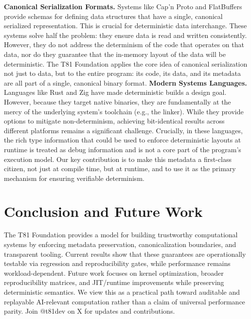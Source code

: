\documentclass[sigconf, 10pt]{acmart}
\begin{document}
\textbf{Canonical Serialization Formats.} Systems like Cap'n Proto \cite{capnproto} and FlatBuffers \cite{flatbuffers} provide schemas for defining data structures that have a single, canonical serialized representation. This is crucial for deterministic data interchange. These systems solve half the problem: they ensure data is read and written consistently. However, they do not address the determinism of the code that operates on that data, nor do they guarantee that the in-memory layout of the data will be deterministic. The T81 Foundation applies the core idea of canonical serialization not just to data, but to the entire program: its code, its data, and its metadata are all part of a single, canonical binary format.
\textbf{Modern Systems Languages.} Languages like Rust \cite{rust} and Zig \cite{zig} have made deterministic builds a design goal. However, because they target native binaries, they are fundamentally at the mercy of the underlying system's toolchain (e.g., the linker). While they provide options to mitigate non-determinism, achieving bit-identical results across different platforms remains a significant challenge. Crucially, in these languages, the rich type information that could be used to enforce deterministic layouts at runtime is treated as debug information and is not a core part of the program's execution model. Our key contribution is to make this metadata a first-class citizen, not just at compile time, but at runtime, and to use it as the primary mechanism for ensuring verifiable determinism.
\section{Conclusion and Future Work}
The T81 Foundation provides a model for building trustworthy computational systems by enforcing metadata preservation, canonicalization boundaries, and transparent tooling. Current results show that these guarantees are operationally testable via regression and reproducibility gates, while performance remains workload-dependent. Future work focuses on kernel optimization, broader reproducibility matrices, and JIT/runtime improvements while preserving deterministic semantics. We view this as a practical path toward auditable and replayable AI-relevant computation rather than a claim of universal performance parity. Join @t81dev on X for updates and contributions.
\end{document}
